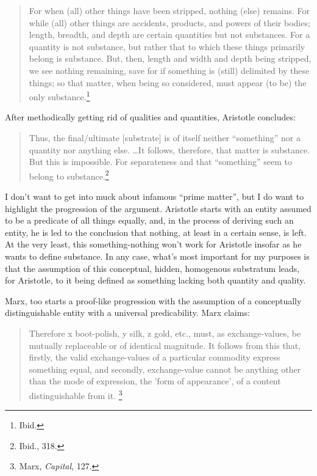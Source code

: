 \documentclass[12pt]{article}
\begin{document}
\begin{quote}
\begin{singlespace}
For when (all) other things have been stripped, nothing (else) remains. For while (all) other things are accidents, products, and powers of their bodies; length, breadth, and depth are certain quantities but not substances. For a quantity is not substance, but rather that to which these things primarily belong is substance. But, then, length and width and depth being stripped, we see nothing remaining, save for if something is (still) delimited by these things; so that matter, when being so considered, must appear (to be) the only substance.\footnote{Ibid.}
\end{singlespace}
\end{quote}

After methodically getting rid of qualities and quantities, Aristotle concludes:   

\begin{quote}
\begin{singlespace}
Thus, the final/ultimate [substrate] is of itself neither ``something'' nor a quantity nor anything else. \dots  It follows, therefore, that matter is substance. But this is impossible. For separateness and that ``something'' seem to belong to substance.\footnote{Ibid., 318.}
\end{singlespace}
\end{quote}

I don't want to get into muck about infamous ``prime matter'', but I do want to highlight the progression of the argument. Aristotle starts with an entity assumed to be a predicate of all things equally, and, in the process of deriving such an entity, he is led to the conclusion that nothing, at least in a certain sense, is left. At the very least, this something-nothing won't work for Aristotle insofar as he wants to define substance. In any case, what's most important for my purposes is that the assumption of this conceptual, hidden, homogenous substratum leads, for Aristotle, to it being defined as something lacking both quantity and quality.  

Marx, too starts a proof-like progression with the assumption of a conceptually distinguishable entity with a universal predicability. Marx claims:  

\begin{quote}
\begin{singlespace}
Therefore x boot-polish, y silk, z gold, etc., must, as exchange-values, be mutually replaceable or of identical magnitude. It follows from this that, firstly, the valid exchange-values of a particular commodity express something equal, and secondly, exchange-value cannot be anything other than the mode of expression, the 'form of appearance', of a content distinguishable from it. \footnote{Marx, \textit{Capital}, 127.}
\end{singlespace}
\end{quote}
\end{document}

